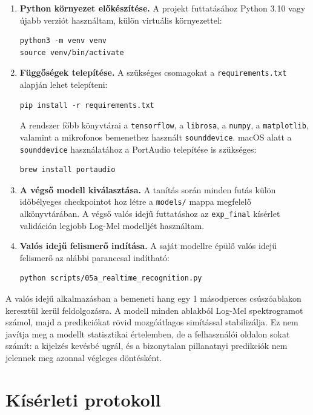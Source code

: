 \begin{enumerate}
    \item \textbf{Python környezet előkészítése.} A projekt futtatásához Python 3.10 vagy újabb verziót használtam, külön virtuális környezettel:
\begin{verbatim}
python3 -m venv venv
source venv/bin/activate
\end{verbatim}

    \item \textbf{Függőségek telepítése.} A szükséges csomagokat a \texttt{requirements.txt} alapján lehet telepíteni:
\begin{verbatim}
pip install -r requirements.txt
\end{verbatim}
    A rendszer főbb könyvtárai a \texttt{tensorflow}, a \texttt{librosa}, a \texttt{numpy}, a \texttt{matplotlib}, valamint a mikrofonos bemenethez használt \texttt{sounddevice}. macOS alatt a \texttt{sounddevice} használatához a PortAudio telepítése is szükséges:
\begin{verbatim}
brew install portaudio
\end{verbatim}

    \item \textbf{A végső modell kiválasztása.} A tanítás során minden futás külön időbélyeges checkpointot hoz létre a \texttt{models/} mappa megfelelő alkönyvtárában. A végső valós idejű futtatáshoz az \texttt{exp\_final} kísérlet validáción legjobb Log-Mel modelljét használtam.

    \item \textbf{Valós idejű felismerő indítása.} A saját modellre épülő valós idejű felismerő az alábbi paranccsal indítható:
\begin{verbatim}
python scripts/05a_realtime_recognition.py
\end{verbatim}
\end{enumerate}

A valós idejű alkalmazásban a bemeneti hang egy 1 másodperces csúszóablakon keresztül kerül feldolgozásra. A modell minden ablakból Log-Mel spektrogramot számol, majd a predikciókat rövid mozgóátlagos simítással stabilizálja. Ez nem javítja meg a modellt statisztikai értelemben, de a felhasználói oldalon sokat számít: a kijelzés kevésbé ugrál, és a bizonytalan pillanatnyi predikciók nem jelennek meg azonnal végleges döntésként.

\section{Kísérleti protokoll}
\label{sec:kiserleti_protokoll}

